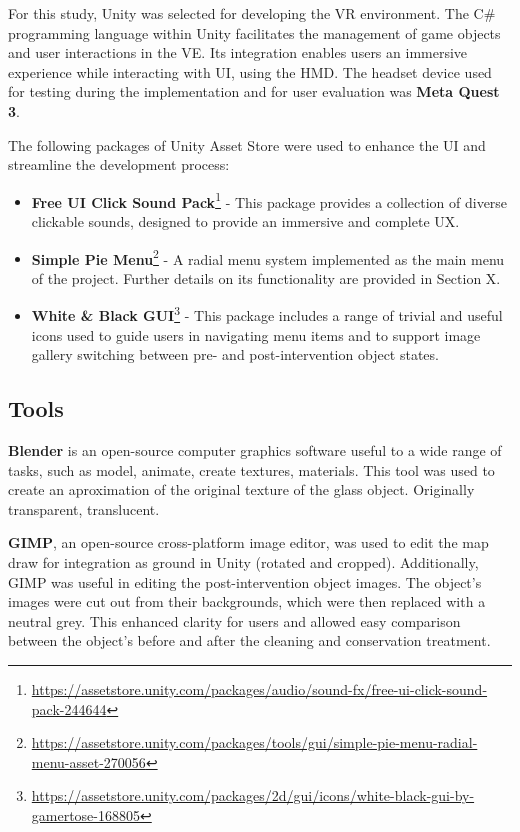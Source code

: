 For this study, Unity was selected for developing the \gls{VR} environment. The C\# programming language within Unity facilitates the management of game objects and user interactions in the \gls{VE}.
Its integration enables users an immersive experience while interacting with \gls{UI}, using the \gls{HMD}. 
The headset device used for testing during the implementation and for user evaluation was \textbf{Meta Quest 3}.

The following packages of Unity Asset Store were used to enhance the \gls{UI} and streamline the development process:

\begin{itemize}
\item{\textbf{Free UI Click Sound Pack}\footnote{\url{https://assetstore.unity.com/packages/audio/sound-fx/free-ui-click-sound-pack-244644}} - This package provides a collection of diverse clickable sounds, designed to provide an immersive and complete \gls{UX}.}
\item{\textbf{Simple Pie Menu}\footnote{\url{https://assetstore.unity.com/packages/tools/gui/simple-pie-menu-radial-menu-asset-270056}}} - A radial menu system implemented as the main menu of the project. Further details on its functionality are provided in Section X.
\item{\textbf{White \& Black GUI}\footnote{\url{https://assetstore.unity.com/packages/2d/gui/icons/white-black-gui-by-gamertose-168805}}} - This package includes a range of trivial and useful icons used to guide users in navigating menu items and to support image gallery switching between pre- and post-intervention object states.
\end{itemize}


\subsection{Tools}
\textbf{Blender} is an open-source computer graphics software useful to a wide range of tasks, such as model, animate, create textures, materials. 
This tool was used to create an aproximation of the original texture of the glass object. Originally transparent, translucent.

\textbf{GIMP}, an open-source cross-platform image editor, was used to edit the map draw for integration as ground in Unity (rotated and cropped).
Additionally, GIMP was useful in editing the post-intervention object images. The object's images were cut out from their backgrounds, which were then replaced with a neutral grey. 
This enhanced clarity for users and allowed easy comparison between the object's before and after the cleaning and conservation treatment.

